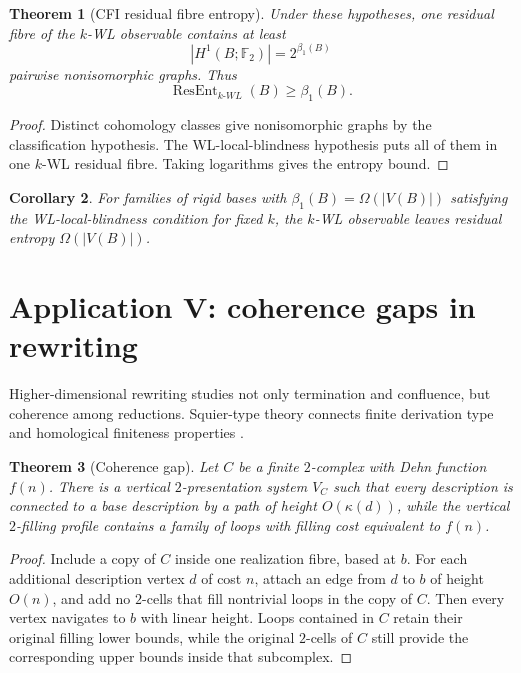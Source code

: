 \documentclass[11pt]{article}
\newtheorem{theorem}{Theorem}[section]
\newtheorem{corollary}[theorem]{Corollary}
\DeclareMathOperator{\ResEnt}{ResEnt}
\begin{document}
\begin{theorem}[CFI residual fibre entropy]
Under these hypotheses, one residual fibre of the \(k\)-WL observable contains at least
\[
|H^1(B;\mathbb F_2)|=2^{\beta_1(B)}
\]
pairwise nonisomorphic graphs.  Thus
\[
\ResEnt_{k\text{-}WL}(B)\ge\beta_1(B).
\]
\end{theorem}

\begin{proof}
Distinct cohomology classes give nonisomorphic graphs by the classification hypothesis.  The WL-local-blindness hypothesis puts all of them in one \(k\)-WL residual fibre.  Taking logarithms gives the entropy bound.
\end{proof}

\begin{corollary}
For families of rigid bases with \(\beta_1(B)=\Omega(|V(B)|)\) satisfying the WL-local-blindness condition for fixed \(k\), the \(k\)-WL observable leaves residual entropy \(\Omega(|V(B)|)\).
\end{corollary}

\section{Application V: coherence gaps in rewriting}

Higher-dimensional rewriting studies not only termination and confluence, but coherence among reductions.  Squier-type theory connects finite derivation type and homological finiteness properties \cite{squier}.

\begin{theorem}[Coherence gap]
Let \(C\) be a finite \(2\)-complex with Dehn function \(f(n)\).  There is a vertical \(2\)-presentation system \(V_C\) such that every description is connected to a base description by a path of height \(O(\kappa(d))\), while the vertical \(2\)-filling profile contains a family of loops with filling cost equivalent to \(f(n)\).
\end{theorem}

\begin{proof}
Include a copy of \(C\) inside one realization fibre, based at \(b\).  For each additional description vertex \(d\) of cost \(n\), attach an edge from \(d\) to \(b\) of height \(O(n)\), and add no \(2\)-cells that fill nontrivial loops in the copy of \(C\).  Then every vertex navigates to \(b\) with linear height.  Loops contained in \(C\) retain their original filling lower bounds, while the original \(2\)-cells of \(C\) still provide the corresponding upper bounds inside that subcomplex.
\end{proof}
\end{document}
